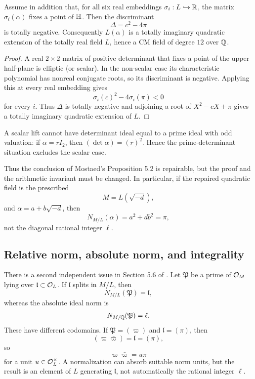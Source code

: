 \begin{proposition}[CM repair]\label{prop:cmrepair}
Assume in addition that, for all six real embeddings $\sigma_i:L\hookrightarrow\mathbb R$, the matrix $\sigma_i(\alpha)$ fixes a point of $\mathbb H$. Then the discriminant
\[
 \Delta=c^2-4\pi
\]
is totally negative. Consequently $L(\alpha)$ is a totally imaginary quadratic extension of the totally real field $L$, hence a CM field of degree $12$ over $\mathbb Q$.
\end{proposition}
\begin{proof}
A real $2\times2$ matrix of positive determinant that fixes a point of the upper half-plane is elliptic (or scalar). In the non-scalar case its characteristic polynomial has nonreal conjugate roots, so its discriminant is negative. Applying this at every real embedding gives
\[
 \sigma_i(c)^2-4\sigma_i(\pi)<0
\]
for every $i$. Thus $\Delta$ is totally negative and adjoining a root of $X^2-cX+\pi$ gives a totally imaginary quadratic extension of $L$.
\end{proof}

\begin{remark}
A scalar lift cannot have determinant ideal equal to a prime ideal with odd valuation: if $\alpha=rI_2$, then $(\det\alpha)=(r)^2$. Hence the prime-determinant situation excludes the scalar case.
\end{remark}

Thus the conclusion of Mostaed's Proposition 5.2 is repairable, but the proof and the arithmetic invariant must be changed. In particular, if the repaired quadratic field is the prescribed
\[
 M=L(\sqrt{-d}),
\]
and $\alpha=a+b\sqrt{-d}$, then
\begin{equation}\label{eq:normpi}
 N_{M/L}(\alpha)=a^2+db^2=\pi,
\end{equation}
not the diagonal rational integer $\ell$.


\subsection{Relative norm, absolute norm, and integrality}
There is a second independent issue in Section 5.6 of \cite{Mostaed2026}. Let $\mathfrak P$ be a prime of $\mathcal O_M$ lying over $\mathfrak l\subset\mathcal O_L$. If $\mathfrak l$ splits in $M/L$, then
\[
 N_{M/L}(\mathfrak P)=\mathfrak l,
\]
whereas the absolute ideal norm is
\[
 N_{M/\mathbb Q}(\mathfrak P)=\ell.
\]
These have different codomains. If $\mathfrak P=(\varpi)$ and $\mathfrak l=(\pi)$, then
\[
 (\varpi\bar\varpi)=\mathfrak l=(\pi),
\]
so
\begin{equation}\label{eq:unitpi}
 \varpi\bar\varpi=u\pi
\end{equation}
for a unit $u\in\mathcal O_L^\times$. A normalization can absorb suitable norm units, but the result is an element of $L$ generating $\mathfrak l$, not automatically the rational integer $\ell$.

